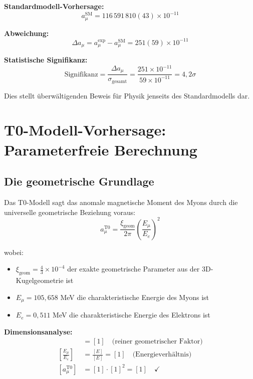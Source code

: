 \documentclass[12pt,a4paper]{report}
\newcommand{\xigeom}{\xi_{\text{geom}}}   %
\newcommand{\Ee}{E_e}                     %
\newcommand{\Emu}{E_\mu}                  %
\begin{document}
\textbf{Standardmodell-Vorhersage:}
\begin{equation}
	a_\mu^{\text{SM}} = 116\,591\,810(43) \times 10^{-11}
	\label{eq:sm_prediction}
\end{equation}

\textbf{Abweichung:}
\begin{equation}
	\Delta a_\mu = a_\mu^{\text{exp}} - a_\mu^{\text{SM}} = 251(59) \times 10^{-11}
	\label{eq:discrepancy}
\end{equation}

\textbf{Statistische Signifikanz:}
\begin{equation}
	\text{Signifikanz} = \frac{\Delta a_\mu}{\sigma_{\text{gesamt}}} = \frac{251 \times 10^{-11}}{59 \times 10^{-11}} = 4,2\sigma
	\label{eq:significance}
\end{equation}

Dies stellt überwältigenden Beweis für Physik jenseits des Standardmodells dar.

\section{T0-Modell-Vorhersage: Parameterfreie Berechnung}
\label{sec:t0_prediction}

\subsection{Die geometrische Grundlage}
\label{subsec:geometric_foundation}

Das T0-Modell sagt das anomale magnetische Moment des Myons durch die universelle geometrische Beziehung voraus:
\begin{equation}
	a_\mu^{\text{T0}} = \frac{\xigeom}{2\pi} \left(\frac{\Emu}{\Ee}\right)^2
	\label{eq:t0_prediction}
\end{equation}

wobei:
\begin{itemize}
	\item $\xigeom = \frac{4}{3} \times 10^{-4}$ der exakte geometrische Parameter aus der 3D-Kugelgeometrie ist
	\item $\Emu = 105,658$ MeV die charakteristische Energie des Myons ist
	\item $\Ee = 0,511$ MeV die charakteristische Energie des Elektrons ist
\end{itemize}

\textbf{Dimensionsanalyse:}
\begin{align}
	[\xigeom] &= [1] \quad \text{(reiner geometrischer Faktor)} \\
	\left[\frac{\Emu}{\Ee}\right] &= \frac{[E]}{[E]} = [1] \quad \text{(Energieverhältnis)} \\
	[a_\mu^{\text{T0}}] &= [1] \cdot [1]^2 = [1] \quad \checkmark
\end{align}
\end{document}
